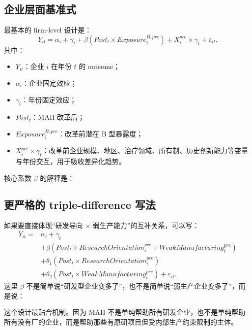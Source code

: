 \documentclass[12pt]{ctexart}
\begin{document}
\subsection{企业层面基准式}

最基本的 firm-level 设计是：
\[
Y_{it}=\alpha_i+\gamma_t+\beta\left(Post_t\times Exposure_i^{B,pre}\right)+X_i^{pre}\times\gamma_t+\varepsilon_{it}.
\]
其中：
\begin{itemize}
    \item $Y_{it}$：企业 $i$ 在年份 $t$ 的 outcome；
    \item $\alpha_i$：企业固定效应；
    \item $\gamma_t$：年份固定效应；
    \item $Post_t$：MAH 改革后；
    \item $Exposure_i^{B,pre}$：改革前潜在 B 型暴露度；
    \item $X_i^{pre}\times\gamma_t$：改革前企业规模、地区、治疗领域、所有制、历史创新能力等变量与年份交互，用于吸收差异化趋势。
\end{itemize}
核心系数 $\beta$ 的解释是：
\begin{center}
\end{center}

\subsection{更严格的 triple-difference 写法}

如果要直接体现“研发导向 $\times$ 弱生产能力”的互补关系，可以写：
\[
\begin{aligned}
Y_{it}={}&\alpha_i+\gamma_t\\
&+\beta\left(Post_t\times ResearchOrientation_i^{pre}\times WeakManufacturing_i^{pre}\right) \\
&+\theta_1\left(Post_t\times ResearchOrientation_i^{pre}\right)\\
&+\theta_2\left(Post_t\times WeakManufacturing_i^{pre}\right)+\varepsilon_{it}.
\end{aligned}
\]
这里 $\beta$ 不是简单说“研发型企业变多了”，也不是简单说“弱生产企业变多了”，而是说：
\begin{center}
\end{center}
这个设计最贴合机制。因为 MAH 不是单纯帮助所有研发企业，也不是单纯帮助所有没有厂的企业，而是帮助那些有原研项目但受内部生产约束限制的主体。
\end{document}
